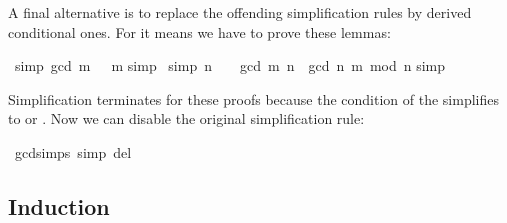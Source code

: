 \begin{isabellebody}
\begin{isamarkuptext}
A final alternative is to replace the offending simplification rules by
derived conditional ones. For  it means we have to prove
these lemmas:%
\end{isamarkuptext}%
\isamarkuptrue%
\isamarkupfalse%
\ {}simp{}{}\ {}gcd\ m\ {}\ {}\ m{}\isanewline
%
\isadelimproof
%
\endisadelimproof
%
\isatagproof
{}\isamarkupfalse%
{}simp{}\isanewline
{}\isamarkupfalse%
%
\endisatagproof
{\isafoldproof}%
%
\isadelimproof
\isanewline
%
\endisadelimproof
\isanewline
{}\isamarkupfalse%
\ {}simp{}{}\ {}n\ {}\ {}\ {}\ gcd\ m\ n\ {}\ gcd\ n\ {}m\ mod\ n{}{}\isanewline
%
\isadelimproof
%
\endisadelimproof
%
\isatagproof
{}\isamarkupfalse%
{}simp{}\isanewline
{}\isamarkupfalse%
%
\endisatagproof
{\isafoldproof}%
%
\isadelimproof
%
\endisadelimproof
%
\begin{isamarkuptext}%
\noindent
Simplification terminates for these proofs because the condition of the  simplifies to  or .
Now we can disable the original simplification rule:%
\end{isamarkuptext}%
\isamarkuptrue%
\isamarkupfalse%
\ gcd{}simps\ {}simp\ del{}%
\begin{isamarkuptext}%

\subsection{Induction}
\label{sec:fun-induction}


\end{isamarkuptext}
\end{isabellebody}
